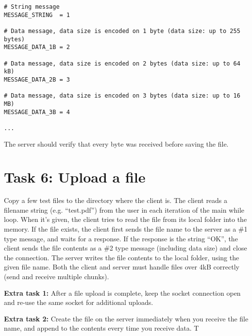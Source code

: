 \begin{lstlisting}[style=python]
# String message
MESSAGE_STRING  = 1

# Data message, data size is encoded on 1 byte (data size: up to 255 bytes)
MESSAGE_DATA_1B = 2

# Data message, data size is encoded on 2 bytes (data size: up to 64 kB)
MESSAGE_DATA_2B = 3

# Data message, data size is encoded on 3 bytes (data size: up to 16 MB)
MESSAGE_DATA_3B = 4

...
\end{lstlisting}  

The server should verify that every byte was received before saving the file.

\section*{Task 6: Upload a file}

Copy a few test files to the directory where the client is. The client reads a filename string  (e.g. “test.pdf”) from the user in each iteration of the main while loop. When it’s given, the client tries to read the file from its local folder into the memory. If the file exists, the client first sends the file name to the server as a \#1 type message, and waits for a response. If the response is the string “OK”, the client sends the file contents as a \#2 type message (including data size) and close the connection. The server writes the file contents to the local folder, using the given file name. 
Both the client and server must handle files over 4kB correctly (send and receive multiple chunks).

\textbf{Extra task 1:} After a file upload is complete, keep the socket connection open and re-use the same socket for additional uploads.

\textbf{Extra task 2:} Create the file on the server immediately when you receive the file name, and append to the contents every time you receive data. T


